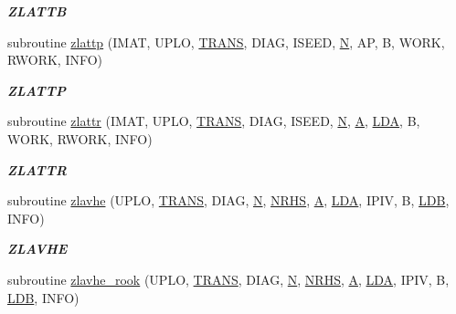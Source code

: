 \begin{DoxyCompactItemize}
\begin{DoxyCompactList}\small\item\em {\bfseries Z\+L\+A\+T\+T\+B} \end{DoxyCompactList}\item 
subroutine \hyperlink{group__complex16__lin_gab305ec24a9b9679188c33e92620ebfe3}{zlattp} (I\+M\+A\+T, U\+P\+L\+O, \hyperlink{superlu__enum__consts_8h_a0c4e17b2d5cea33f9991ccc6a6678d62a1f61e3015bfe0f0c2c3fda4c5a0cdf58}{T\+R\+A\+N\+S}, D\+I\+A\+G, I\+S\+E\+E\+D, \hyperlink{polmisc_8c_a0240ac851181b84ac374872dc5434ee4}{N}, A\+P, B, W\+O\+R\+K, R\+W\+O\+R\+K, I\+N\+F\+O)
\begin{DoxyCompactList}\small\item\em {\bfseries Z\+L\+A\+T\+T\+P} \end{DoxyCompactList}\item 
subroutine \hyperlink{group__complex16__lin_gada6ae281946312d394c98c2fb33bbfc5}{zlattr} (I\+M\+A\+T, U\+P\+L\+O, \hyperlink{superlu__enum__consts_8h_a0c4e17b2d5cea33f9991ccc6a6678d62a1f61e3015bfe0f0c2c3fda4c5a0cdf58}{T\+R\+A\+N\+S}, D\+I\+A\+G, I\+S\+E\+E\+D, \hyperlink{polmisc_8c_a0240ac851181b84ac374872dc5434ee4}{N}, \hyperlink{classA}{A}, \hyperlink{example__user_8c_ae946da542ce0db94dced19b2ecefd1aa}{L\+D\+A}, B, W\+O\+R\+K, R\+W\+O\+R\+K, I\+N\+F\+O)
\begin{DoxyCompactList}\small\item\em {\bfseries Z\+L\+A\+T\+T\+R} \end{DoxyCompactList}\item 
subroutine \hyperlink{group__complex16__lin_ga21bcdd5aac646c1d1485c53b82ca6dc4}{zlavhe} (U\+P\+L\+O, \hyperlink{superlu__enum__consts_8h_a0c4e17b2d5cea33f9991ccc6a6678d62a1f61e3015bfe0f0c2c3fda4c5a0cdf58}{T\+R\+A\+N\+S}, D\+I\+A\+G, \hyperlink{polmisc_8c_a0240ac851181b84ac374872dc5434ee4}{N}, \hyperlink{example__user_8c_aa0138da002ce2a90360df2f521eb3198}{N\+R\+H\+S}, \hyperlink{classA}{A}, \hyperlink{example__user_8c_ae946da542ce0db94dced19b2ecefd1aa}{L\+D\+A}, I\+P\+I\+V, B, \hyperlink{example__user_8c_a50e90a7104df172b5a89a06c47fcca04}{L\+D\+B}, I\+N\+F\+O)
\begin{DoxyCompactList}\small\item\em {\bfseries Z\+L\+A\+V\+H\+E} \end{DoxyCompactList}\item 
subroutine \hyperlink{group__complex16__lin_ga21a23f83120cc66fe6e1e90c97bc5412}{zlavhe\+\_\+rook} (U\+P\+L\+O, \hyperlink{superlu__enum__consts_8h_a0c4e17b2d5cea33f9991ccc6a6678d62a1f61e3015bfe0f0c2c3fda4c5a0cdf58}{T\+R\+A\+N\+S}, D\+I\+A\+G, \hyperlink{polmisc_8c_a0240ac851181b84ac374872dc5434ee4}{N}, \hyperlink{example__user_8c_aa0138da002ce2a90360df2f521eb3198}{N\+R\+H\+S}, \hyperlink{classA}{A}, \hyperlink{example__user_8c_ae946da542ce0db94dced19b2ecefd1aa}{L\+D\+A}, I\+P\+I\+V, B, \hyperlink{example__user_8c_a50e90a7104df172b5a89a06c47fcca04}{L\+D\+B}, I\+N\+F\+O)

\end{DoxyCompactItemize}
